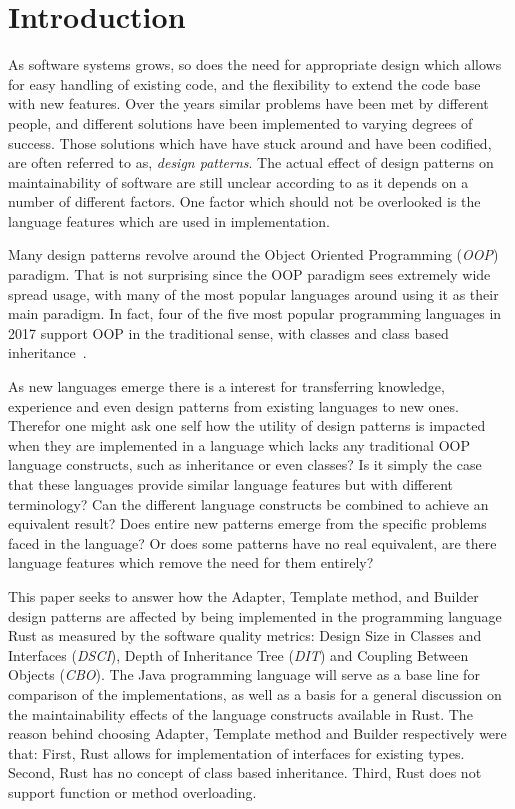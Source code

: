 \documentclass[conference]{IEEEtran}
\begin{document}
\section{Introduction}
As software systems grows, so does the need for appropriate design which allows for easy handling of existing code, and the flexibility to extend the code base with new features.
Over the years similar problems have been met by different people, and different solutions have been implemented to varying degrees of success.
Those solutions which have have stuck around and have been codified, are often referred to as, \emph{design patterns}.
The actual effect of design patterns on maintainability of software are still unclear according to \citet{zhang2012:pattern-effectiveness} as it depends on a number of different factors. 
One factor which should not be overlooked is the language features which are used in implementation.

Many design patterns revolve around the Object Oriented Programming (\emph{OOP}) paradigm.
That is not surprising since the OOP paradigm sees extremely wide spread usage, with many of the most popular languages around using it as their main paradigm.
In fact, four of the five most popular programming languages in 2017 support OOP in the traditional sense, with classes and class based inheritance~\cite{ieee:lang_usage}.

As new languages emerge there is a interest for transferring knowledge, experience and even design patterns from existing languages to new ones.
Therefor one might ask one self how the utility of design patterns is impacted when they are implemented in a language which lacks any traditional OOP language constructs, such as inheritance or even classes?
Is it simply the case that these languages provide similar language features but with different terminology?
Can the different language constructs be combined to achieve an equivalent result?
Does entire new patterns emerge from the specific problems faced in the language?
Or does some patterns have no real equivalent, are there language features which remove the need for them entirely?

This paper seeks to answer how the Adapter, Template method, and Builder design patterns are affected by being implemented in the programming language Rust as measured by the software quality metrics: Design Size in Classes and Interfaces (\emph{DSCI}), Depth of Inheritance Tree (\emph{DIT}) and Coupling Between Objects (\emph{CBO}).
The Java programming language will serve as a base line for comparison of the implementations, as well as a basis for a general discussion on the maintainability effects of the language constructs available in Rust.
The reason behind choosing Adapter, Template method and Builder respectively were that:
First, Rust allows for implementation of interfaces for existing types.
Second, Rust has no concept of class based inheritance.
Third, Rust does not support function or method overloading.
\end{document}
